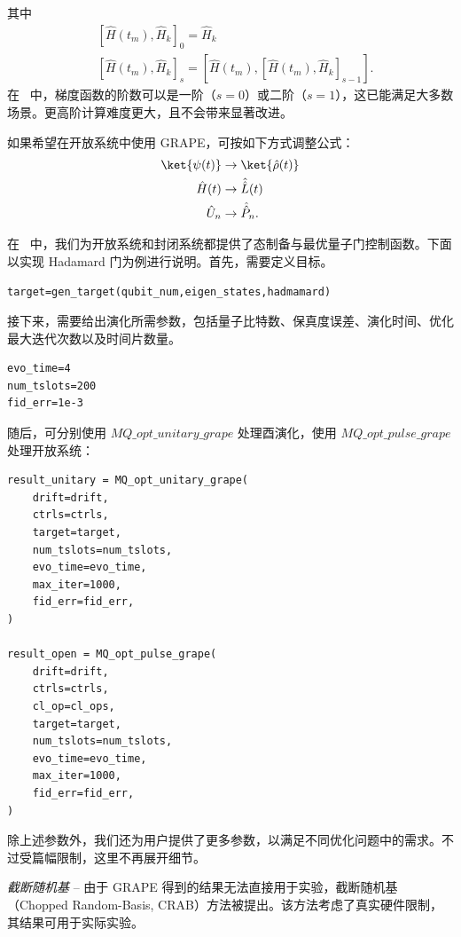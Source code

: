 其中
\begin{equation}
    \begin{split}
        &\left[\hat{H}(t_m),\hat{H}_{k}\right]_{0}=\hat{H}_{k}\\
        &\left[\hat{H}(t_m),\hat{H}_{k}\right]_{s}=\left[\hat{H}(t_m),\left[\hat{H}(t_m),\hat{H}_{k}\right]_{s-1}\right].
    \end{split}
\end{equation}
在 \MindQuantum\ 中，梯度函数的阶数可以是一阶（$s=0$）或二阶（$s=1$），这已能满足大多数场景。更高阶计算难度更大，且不会带来显著改进。

如果希望在开放系统中使用 GRAPE，可按如下方式调整公式：
\begin{equation}
    \begin{split}
        \ket{\psi(t)}&\to \ket{\hat{\rho}(t)}\\
        \hat{H}(t)&\to \hat{\hat{L}}(t)\\
        \hat{U}_{n}&\to \hat{\hat{P}}_{n}.\\
    \end{split}
\end{equation}

在 \MindQuantum\ 中，我们为开放系统和封闭系统都提供了态制备与最优量子门控制函数。下面以实现 Hadamard 门为例进行说明。首先，需要定义目标。
\begin{lstlisting}
target=gen_target(qubit_num,eigen_states,hadmamard)
\end{lstlisting}
接下来，需要给出演化所需参数，包括量子比特数、保真度误差、演化时间、优化最大迭代次数以及时间片数量。
\begin{lstlisting}
evo_time=4
num_tslots=200
fid_err=1e-3
\end{lstlisting}
随后，可分别使用 $MQ\_opt\_unitary\_grape$ 处理酉演化，使用 $MQ\_opt\_pulse\_grape$ 处理开放系统：
\begin{lstlisting}
result_unitary = MQ_opt_unitary_grape(
    drift=drift,
    ctrls=ctrls,
    target=target,
    num_tslots=num_tslots,
    evo_time=evo_time,
    max_iter=1000,
    fid_err=fid_err,
)

result_open = MQ_opt_pulse_grape(
    drift=drift,
    ctrls=ctrls,
    cl_op=cl_ops,
    target=target,
    num_tslots=num_tslots,
    evo_time=evo_time,
    max_iter=1000,
    fid_err=fid_err,
)
\end{lstlisting}
除上述参数外，我们还为用户提供了更多参数，以满足不同优化问题中的需求。不过受篇幅限制，这里不再展开细节。

\textit{截断随机基} -- 由于 GRAPE 得到的结果无法直接用于实验，截断随机基（Chopped Random-Basis, CRAB）方法被提出。该方法考虑了真实硬件限制，其结果可用于实际实验。

